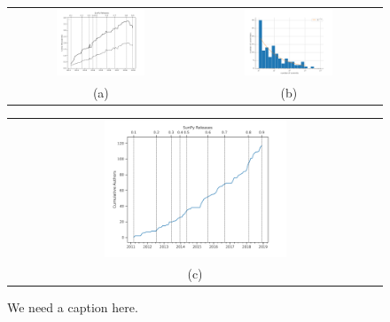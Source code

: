 \begin{figure}
\begin{tabular}{cc}
  \includegraphics[width=0.5\textwidth]{figures/sunpy_history.pdf} &
  \includegraphics[width=0.5\textwidth]{figures/busfactor_plot.pdf} \\
(a) & (b)  \\
\end{tabular}
\begin{tabular}{c}
  \includegraphics[width=0.5\textwidth]{figures/cumulative_authors.pdf} \\
(c)  \\
\end{tabular}
\caption{We need a caption here.}
\label{fig:image2}
\end{figure}